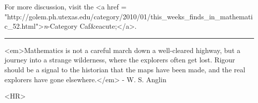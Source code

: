For more discussion, visit the <a href = "http://golem.ph.utexas.edu/category/2010/01/this_weeks_finds_in_mathematic_52.html">\emph{n}-Category Caf&eacute;</a>.


\par\noindent\rule{\textwidth}{0.4pt}
<em>Mathematics is not a careful march down a well-cleared highway, but a
journey into a strange wilderness, where the explorers often get lost.
Rigour should be a signal to the historian that the maps have been
made, and the real explorers have gone elsewhere.</em> - W. S. Anglin

<HR>



